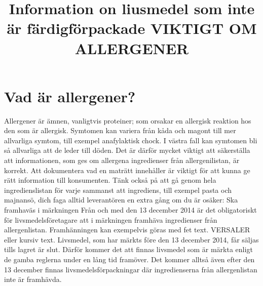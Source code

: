 
\title{
Information on liusmedel som inte är färdigförpackade
}

\title{
VIKTIGT OM ALLERGENER
}
\section*{Vad är allergener?}
Allergener är ämnen, vanligtvis proteiner; som orsakar en allergisk reaktion hos den som är allergisk. Symtomen kan variera från kåda och magont till mer allvarliga symtom, till exempel anafylaktisk chock.
I västra fall kan symtomen bli så allvarliga att de leder till döden. Det är därför mycket viktigt att säkerställa att informationen, som ges om allergena ingredienser från allergenilistan, är korrekt. Att dokumentera vad en maträtt innehåller är viktigt för att kunna ge rätt information till konsumenten. Tänk också på att gå genom hela ingredienslistan för varje sammanst att ingrediens, till exempel pasta och majnansö, dich faga alltid leverantören en extra gång om du är osäker:
Ska framhaväs i märkningen
Från och med den 13 december 2014 är det obligatoriskt för livsmedelsföretagare att i märkningen framhäva ingredienser från allergenlistan. Framhänningen kan exempelvis göras med fet text. VERSALER eller kursiv text. Livsmedel, som har märkts före den 13 december 2014, får säljas tills lagret är slut. Därför kommer det att finnas livsmedel som är märkta enligt de gamba reglerna under en lång tid framöver. Det kommer alltså även efter den 13 december finnas livsmedelsförpackningar där ingredienserna från allergenlistan inte är framhävda.
